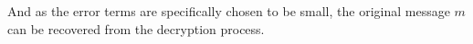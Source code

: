 And as the error terms are specifically chosen to be small, the original message $m$ can be recovered from the decryption process.




